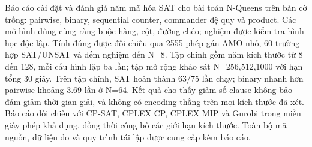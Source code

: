Báo cáo cài đặt và đánh giá năm mã hóa SAT cho bài toán N-Queens trên bàn cờ trống: pairwise, binary, sequential counter, commander đệ quy và product. Các mô hình dùng cùng ràng buộc hàng, cột, đường chéo; nghiệm được kiểm tra hình học độc lập. Tính đúng được đối chiếu qua 2555 phép gán AMO nhỏ, 60 trường hợp SAT/UNSAT và đếm nghiệm đến N=8. Tập chính gồm năm kích thước từ 8 đến 128, mỗi cấu hình lặp ba lần; tập mở rộng khảo sát N=256,512,1000 với hạn tổng 30 giây. Trên tập chính, SAT hoàn thành 63/75 lần chạy; binary nhanh hơn pairwise khoảng 3.69 lần ở N=64. Kết quả cho thấy giảm số clause không bảo đảm giảm thời gian giải, và không có encoding thắng trên mọi kích thước đã xét. Báo cáo đối chiếu với CP-SAT, CPLEX CP, CPLEX MIP và Gurobi trong miền giấy phép khả dụng, đồng thời công bố các giới hạn kích thước. Toàn bộ mã nguồn, dữ liệu đo và quy trình tái lập được cung cấp kèm báo cáo.
